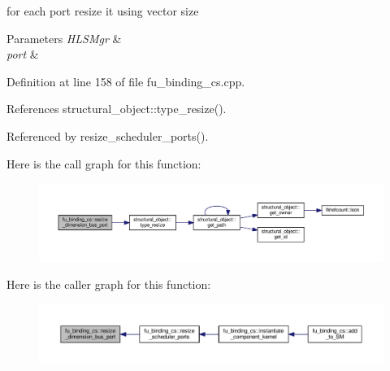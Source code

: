 for each port resize it using vector size 


\begin{DoxyParams}{Parameters}
{\em H\+L\+S\+Mgr} & \\
\hline
{\em port} & \\
\hline
\end{DoxyParams}


Definition at line 158 of file fu\+\_\+binding\+\_\+cs.\+cpp.



References structural\+\_\+object\+::type\+\_\+resize().



Referenced by resize\+\_\+scheduler\+\_\+ports().

Here is the call graph for this function\+:
\nopagebreak
\begin{figure}[H]
\begin{center}
\leavevmode
\includegraphics[width=350pt]{d4/d7b/classfu__binding__cs_a2858be239990d67661b459950778380d_cgraph}
\end{center}
\end{figure}
Here is the caller graph for this function\+:
\nopagebreak
\begin{figure}[H]
\begin{center}
\leavevmode
\includegraphics[width=350pt]{d4/d7b/classfu__binding__cs_a2858be239990d67661b459950778380d_icgraph}
\end{center}
\end{figure}
\mbox{\label{classfu__binding__cs_a747378042d84416750cd1835d80aaa13}} 

